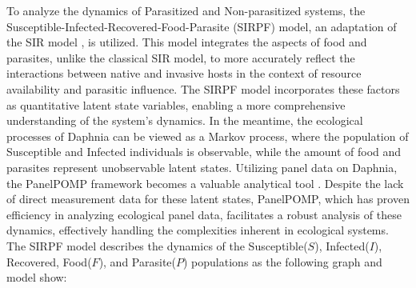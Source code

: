 \documentclass[12pt]{article}
\begin{document}
To analyze the dynamics of Parasitized and Non-parasitized systems, the Susceptible-Infected-Recovered-Food-Parasite (SIRPF) model, an adaptation of the SIR model \cite{weiss2013sir}, is utilized. This model integrates the aspects of food and parasites, unlike the classical SIR model, to more accurately reflect the interactions between native and invasive hosts in the context of resource availability and parasitic influence. The SIRPF model incorporates these factors as quantitative latent state variables, enabling a more comprehensive understanding of the system's dynamics. In the meantime, the ecological processes of Daphnia can be viewed as a Markov process, where the population of Susceptible and Infected individuals is observable, while the amount of food and parasites represent unobservable latent states. Utilizing panel data on Daphnia, the PanelPOMP framework becomes a valuable analytical tool \cite{Carles2020}. Despite the lack of direct measurement data for these latent states, PanelPOMP, which has proven efficiency in analyzing ecological panel data, facilitates a robust analysis of these dynamics, effectively handling the complexities inherent in ecological systems.\\

The SIRPF model describes the dynamics of the Susceptible($S$), Infected($I$), Recovered, Food($F$), and Parasite($P$) populations as the following graph and model show: 

\usetikzlibrary{positioning}
\usetikzlibrary {arrows.meta}
\usetikzlibrary{shapes.geometric}
\end{document}
